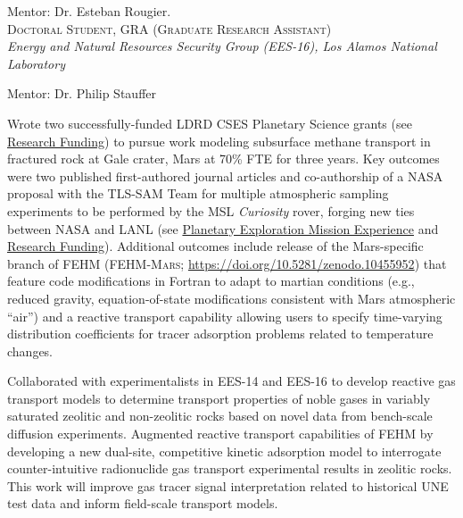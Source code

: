 \documentclass[11pt, letterpaper]{article}
\newcommand{\years}[1]{\marginnote{\scriptsize #1}}
\begin{document}
    \vspace{3pt} \noindent  
    Mentor: Dr. Esteban Rougier.  \\

\noindent
\years{2020 - 2024}\textsc{Doctoral Student, GRA (Graduate Research Assistant)}\\
\textit{Energy and Natural Resources Security Group (EES-16), Los Alamos National Laboratory}

    \vspace{3pt} \noindent  
    Mentor: Dr. Philip Stauffer 

    Wrote two successfully-funded LDRD CSES Planetary Science grants (see
    \hyperref[sec:funding]{Research Funding}) to pursue work modeling
    subsurface methane transport in fractured rock at Gale crater, Mars at 70\%
    FTE for three years. Key outcomes were two published first-authored journal
    articles and co-authorship of a NASA proposal with the TLS-SAM Team for
    multiple atmospheric sampling experiments to be performed by the MSL
    \textit{Curiosity} rover, forging new ties between NASA and LANL (see
    \hyperref[sec:missions]{Planetary Exploration Mission Experience} and
    \hyperref[sec:funding]{Research Funding}). Additional outcomes include release
    of the Mars-specific branch of FEHM (\textsc{FEHM-Mars};
    \href{https://doi.org/10.5281/zenodo.10455952}{https://doi.org/10.5281/zenodo.10455952})
    that feature code modifications in Fortran to adapt to martian conditions (e.g., reduced
        gravity, equation-of-state modifications consistent with Mars atmospheric
    ``air'') and a reactive transport capability allowing users to specify
    time-varying distribution coefficients for tracer adsorption problems related
    to temperature changes.

    Collaborated with experimentalists in EES-14 and EES-16 to develop reactive
    gas transport models to determine transport properties of noble gases in
    variably saturated zeolitic and non-zeolitic rocks based on novel data from
    bench-scale diffusion experiments. Augmented reactive transport
    capabilities of FEHM by developing a new dual-site, competitive kinetic
    adsorption model to interrogate counter-intuitive radionuclide gas
    transport experimental results in zeolitic rocks. This work will improve
    gas tracer signal interpretation related to historical UNE test data and
    inform field-scale transport models.
\end{document}
